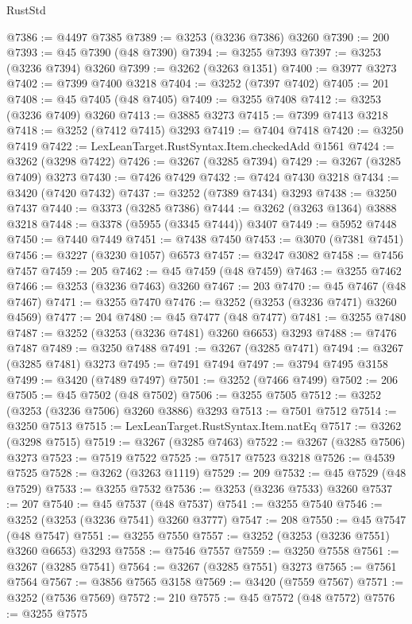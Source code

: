 \begin{lexlean}{RustStd}
\begin{coremodule}
{\begin{coremodule}
{{{{{{{{{{{{{{{{{{{{{{{{{{{{{{{{{{{{{{{@7386 := @4497 @7385
@7389 := @3253 (@3236 @7386) @3260
@7390 := 200
@7393 := @45 @7390 (@48 @7390)
@7394 := @3255 @7393
@7397 := @3253 (@3236 @7394) @3260
@7399 := @3262 (@3263 @1351)
@7400 := @3977 @3273
@7402 := @7399 @7400 @3218
@7404 := @3252 (@7397 @7402)
@7405 := 201
@7408 := @45 @7405 (@48 @7405)
@7409 := @3255 @7408
@7412 := @3253 (@3236 @7409) @3260
@7413 := @3885 @3273
@7415 := @7399 @7413 @3218
@7418 := @3252 (@7412 @7415) @3293
@7419 := @7404 @7418
@7420 := @3250 @7419
@7422 := LexLeanTarget.RustSyntax.Item.checkedAdd @1561
@7424 := @3262 (@3298 @7422)
@7426 := @3267 (@3285 @7394)
@7429 := @3267 (@3285 @7409) @3273
@7430 := @7426 @7429
@7432 := @7424 @7430 @3218
@7434 := @3420 (@7420 @7432)
@7437 := @3252 (@7389 @7434) @3293
@7438 := @3250 @7437
@7440 := @3373 (@3285 @7386)
@7444 := @3262 (@3263 @1364) @3888 @3218
@7448 := @3378 (@5955 (@3345 @7444)) @3407
@7449 := @5952 @7448
@7450 := @7440 @7449
@7451 := @7438 @7450
@7453 := @3070 (@7381 @7451)
@7456 := @3227 (@3230 @1057) @6573
@7457 := @3247 @3082
@7458 := @7456 @7457
@7459 := 205
@7462 := @45 @7459 (@48 @7459)
@7463 := @3255 @7462
@7466 := @3253 (@3236 @7463) @3260
@7467 := 203
@7470 := @45 @7467 (@48 @7467)
@7471 := @3255 @7470
@7476 := @3252 (@3253 (@3236 @7471) @3260 @4569)
@7477 := 204
@7480 := @45 @7477 (@48 @7477)
@7481 := @3255 @7480
@7487 := @3252 (@3253 (@3236 @7481) @3260 @6653) @3293
@7488 := @7476 @7487
@7489 := @3250 @7488
@7491 := @3267 (@3285 @7471)
@7494 := @3267 (@3285 @7481) @3273
@7495 := @7491 @7494
@7497 := @3794 @7495 @3158
@7499 := @3420 (@7489 @7497)
@7501 := @3252 (@7466 @7499)
@7502 := 206
@7505 := @45 @7502 (@48 @7502)
@7506 := @3255 @7505
@7512 := @3252 (@3253 (@3236 @7506) @3260 @3886) @3293
@7513 := @7501 @7512
@7514 := @3250 @7513
@7515 := LexLeanTarget.RustSyntax.Item.natEq
@7517 := @3262 (@3298 @7515)
@7519 := @3267 (@3285 @7463)
@7522 := @3267 (@3285 @7506) @3273
@7523 := @7519 @7522
@7525 := @7517 @7523 @3218
@7526 := @4539 @7525
@7528 := @3262 (@3263 @1119)
@7529 := 209
@7532 := @45 @7529 (@48 @7529)
@7533 := @3255 @7532
@7536 := @3253 (@3236 @7533) @3260
@7537 := 207
@7540 := @45 @7537 (@48 @7537)
@7541 := @3255 @7540
@7546 := @3252 (@3253 (@3236 @7541) @3260 @3777)
@7547 := 208
@7550 := @45 @7547 (@48 @7547)
@7551 := @3255 @7550
@7557 := @3252 (@3253 (@3236 @7551) @3260 @6653) @3293
@7558 := @7546 @7557
@7559 := @3250 @7558
@7561 := @3267 (@3285 @7541)
@7564 := @3267 (@3285 @7551) @3273
@7565 := @7561 @7564
@7567 := @3856 @7565 @3158
@7569 := @3420 (@7559 @7567)
@7571 := @3252 (@7536 @7569)
@7572 := 210
@7575 := @45 @7572 (@48 @7572)
@7576 := @3255 @7575
}}}}}}}}}}}}}}}}}}}}}}}}}}}}}}}}}}}}}}}
\end{coremodule}}
\end{coremodule}
\end{lexlean}
